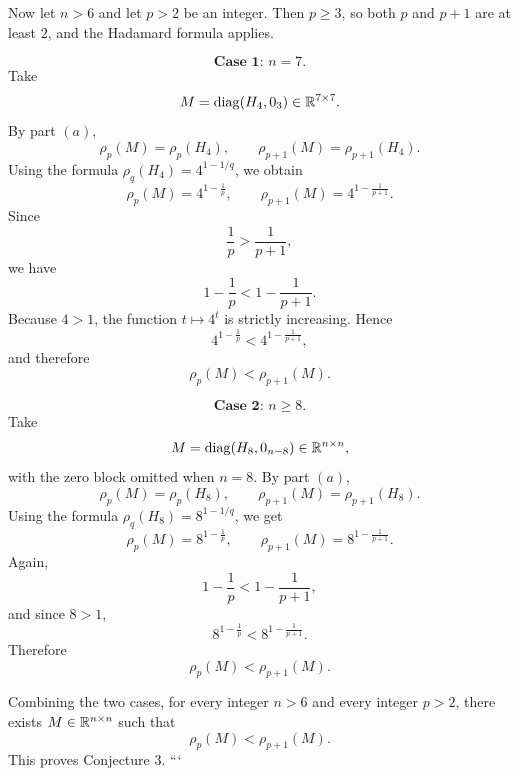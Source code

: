 Now let \(n>6\) and let \(p>2\) be an integer. Then \(p\ge 3\), so both \(p\) and \(p+1\) are at least \(2\), and the Hadamard formula applies.

\[
\textbf{Case 1: } n=7.
\]
Take
\[
M=\operatorname{diag}(H_4,0_3)\in\mathbb{R}^{7\times 7}.
\]
By part \((a)\),
\[
\rho_p(M)=\rho_p(H_4),
\qquad
\rho_{p+1}(M)=\rho_{p+1}(H_4).
\]
Using the formula \(\rho_q(H_4)=4^{1-1/q}\), we obtain
\[
\rho_p(M)=4^{1-\frac1p},
\qquad
\rho_{p+1}(M)=4^{1-\frac1{p+1}}.
\]
Since
\[
\frac1p>\frac1{p+1},
\]
we have
\[
1-\frac1p<1-\frac1{p+1}.
\]
Because \(4>1\), the function \(t\mapsto 4^t\) is strictly increasing. Hence
\[
4^{1-\frac1p}<4^{1-\frac1{p+1}},
\]
and therefore
\[
\rho_p(M)<\rho_{p+1}(M).
\]

\[
\textbf{Case 2: } n\ge 8.
\]
Take
\[
M=\operatorname{diag}(H_8,0_{n-8})\in\mathbb{R}^{n\times n},
\]
with the zero block omitted when \(n=8\). By part \((a)\),
\[
\rho_p(M)=\rho_p(H_8),
\qquad
\rho_{p+1}(M)=\rho_{p+1}(H_8).
\]
Using the formula \(\rho_q(H_8)=8^{1-1/q}\), we get
\[
\rho_p(M)=8^{1-\frac1p},
\qquad
\rho_{p+1}(M)=8^{1-\frac1{p+1}}.
\]
Again,
\[
1-\frac1p<1-\frac1{p+1},
\]
and since \(8>1\),
\[
8^{1-\frac1p}<8^{1-\frac1{p+1}}.
\]
Therefore
\[
\rho_p(M)<\rho_{p+1}(M).
\]

Combining the two cases, for every integer \(n>6\) and every integer \(p>2\), there exists \(M\in\mathbb{R}^{n\times n}\) such that
\[
\boxed{\rho_p(M)<\rho_{p+1}(M)}.
\]
This proves Conjecture \(3\).
```